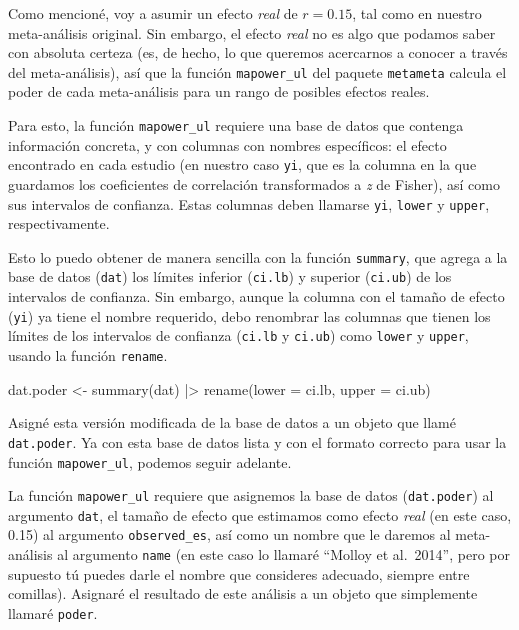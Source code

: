 \documentclass[
  bookmarksnumbered]{article}
\newenvironment{Shaded}{\begin{snugshade}}{\end{snugshade}}
\newcommand{\AttributeTok}[1]{\textcolor[rgb]{0.00,0.34,0.68}{#1}}
\newcommand{\FunctionTok}[1]{\textcolor[rgb]{0.39,0.29,0.61}{#1}}
\newcommand{\NormalTok}[1]{\textcolor[rgb]{0.12,0.11,0.11}{#1}}
\newcommand{\OtherTok}[1]{\textcolor[rgb]{0.00,0.43,0.16}{#1}}
\newcommand{\SpecialCharTok}[1]{\textcolor[rgb]{0.24,0.68,0.91}{#1}}
\begin{document}
Como mencioné, voy a asumir un efecto \emph{real} de \(r = 0.15\), tal como en nuestro meta-análisis original. Sin embargo, el efecto \emph{real} no es algo que podamos saber con absoluta certeza (es, de hecho, lo que queremos acercarnos a conocer a través del meta-análisis), así que la función \texttt{mapower\_ul} del paquete \texttt{metameta} calcula el poder de cada meta-análisis para un rango de posibles efectos reales.

Para esto, la función \texttt{mapower\_ul} requiere una base de datos que contenga información concreta, y con columnas con nombres específicos: el efecto encontrado en cada estudio (en nuestro caso \texttt{yi}, que es la columna en la que guardamos los coeficientes de correlación transformados a \emph{z} de Fisher), así como sus intervalos de confianza. Estas columnas deben llamarse \texttt{yi}, \texttt{lower} y \texttt{upper}, respectivamente.

Esto lo puedo obtener de manera sencilla con la función \texttt{summary}, que agrega a la base de datos (\texttt{dat}) los límites inferior (\texttt{ci.lb}) y superior (\texttt{ci.ub}) de los intervalos de confianza. Sin embargo, aunque la columna con el tamaño de efecto (\texttt{yi}) ya tiene el nombre requerido, debo renombrar las columnas que tienen los límites de los intervalos de confianza (\texttt{ci.lb} y \texttt{ci.ub}) como \texttt{lower} y \texttt{upper}, usando la función \texttt{rename}.

\begin{Shaded}
\begin{Highlighting}[]
\NormalTok{dat.poder }\OtherTok{\textless{}{-}} \FunctionTok{summary}\NormalTok{(dat) }\SpecialCharTok{|\textgreater{}}
  \FunctionTok{rename}\NormalTok{(}\AttributeTok{lower =}\NormalTok{ ci.lb, }\AttributeTok{upper =}\NormalTok{ ci.ub)}
\end{Highlighting}
\end{Shaded}

Asigné esta versión modificada de la base de datos a un objeto que llamé \texttt{dat.poder}. Ya con esta base de datos lista y con el formato correcto para usar la función \texttt{mapower\_ul}, podemos seguir adelante.

La función \texttt{mapower\_ul} requiere que asignemos la base de datos (\texttt{dat.poder}) al argumento \texttt{dat}, el tamaño de efecto que estimamos como efecto \emph{real} (en este caso, 0.15) al argumento \texttt{observed\_es}, así como un nombre que le daremos al meta-análisis al argumento \texttt{name} (en este caso lo llamaré ``Molloy et al.~2014'', pero por supuesto tú puedes darle el nombre que consideres adecuado, siempre entre comillas). Asignaré el resultado de este análisis a un objeto que simplemente llamaré \texttt{poder}.
\end{document}
